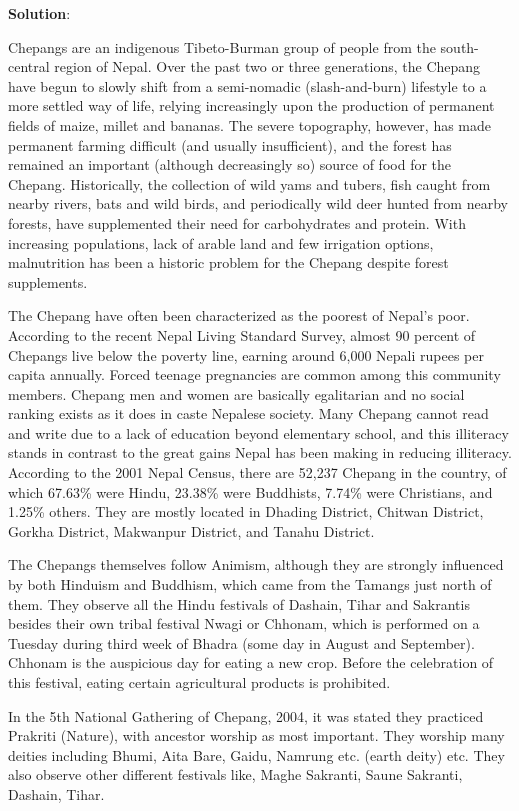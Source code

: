 \documentclass[
  openany]{book}
\newenvironment{solution}{ {\bfseries Solution}:}{}
\begin{document}
\begin{questions}
\begin{solution}

Chepangs are an indigenous Tibeto-Burman group of people from the south-central region of Nepal. Over the past two or three generations, the Chepang have begun to slowly shift from a semi-nomadic (slash-and-burn) lifestyle to a more settled way of life, relying increasingly upon the production of permanent fields of maize, millet and bananas. The severe topography, however, has made permanent farming difficult (and usually insufficient), and the forest has remained an important (although decreasingly so) source of food for the Chepang. Historically, the collection of wild yams and tubers, fish caught from nearby rivers, bats and wild birds, and periodically wild deer hunted from nearby forests, have supplemented their need for carbohydrates and protein. With increasing populations, lack of arable land and few irrigation options, malnutrition has been a historic problem for the Chepang despite forest supplements. 

The Chepang have often been characterized as the poorest of Nepal's poor.
According to the recent Nepal Living Standard Survey, almost 90 percent of Chepangs live below the poverty line, earning around 6,000 Nepali rupees per capita annually. Forced teenage pregnancies are common among this community members. Chepang men and women are basically egalitarian and no social ranking exists as it does in caste Nepalese society. Many Chepang cannot read and write due to a lack of education beyond elementary school, and this illiteracy stands in contrast to the great gains Nepal has been making in reducing illiteracy. According to the 2001 Nepal Census, there are 52,237 Chepang in the country, of which 67.63\% were Hindu, 23.38\% were Buddhists, 7.74\% were Christians, and 1.25\% others. They are mostly located in Dhading District, Chitwan District, Gorkha District, Makwanpur District, and Tanahu District.

The Chepangs themselves follow Animism, although they are strongly influenced by both Hinduism and Buddhism, which came from the Tamangs just north of them. They observe all the Hindu festivals of Dashain, Tihar and Sakrantis besides their own tribal festival Nwagi or Chhonam, which is performed on a Tuesday during third week of Bhadra (some day in August and September). Chhonam is the auspicious day for eating a new crop. Before the celebration of this festival, eating certain agricultural products is prohibited.

In the 5th National Gathering of Chepang, 2004, it was stated they practiced Prakriti (Nature), with ancestor worship as most important. They worship many deities including Bhumi, Aita Bare, Gaidu, Namrung etc. (earth deity) etc. They also observe other different festivals like, Maghe Sakranti, Saune Sakranti, Dashain, Tihar.


\end{solution}
\end{questions}
\end{document}
